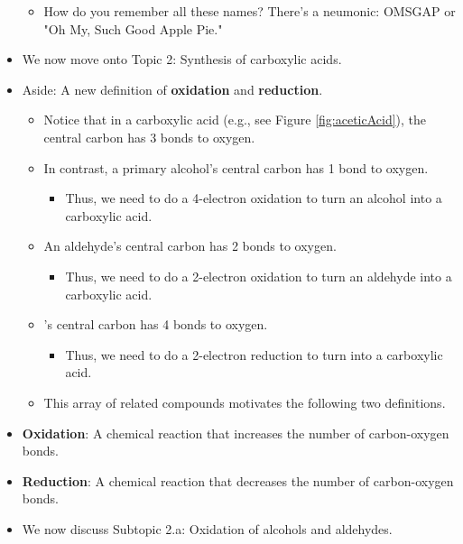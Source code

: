 \documentclass[../notes.tex]{subfiles}
\begin{document}
\begin{itemize}
\begin{itemize}
        \item How do you remember all these names? There's a neumonic: OMSGAP or "Oh My, Such Good Apple Pie."
    \end{itemize}
    \item We now move onto Topic 2: Synthesis of carboxylic acids.
    \item Aside: A new definition of \textbf{oxidation} and \textbf{reduction}.
    \begin{itemize}
        \item Notice that in a carboxylic acid (e.g., see Figure \ref{fig:aceticAcid}), the central carbon has 3 bonds to oxygen.
        \item In contrast, a primary alcohol's central carbon has 1 bond to oxygen.
        \begin{itemize}
            \item Thus, we need to do a 4-electron oxidation to turn an alcohol into a carboxylic acid.
        \end{itemize}
        \item An aldehyde's central carbon has 2 bonds to oxygen.
        \begin{itemize}
            \item Thus, we need to do a 2-electron oxidation to turn an aldehyde into a carboxylic acid.
        \end{itemize}
        \item {}'s central carbon has 4 bonds to oxygen.
        \begin{itemize}
            \item Thus, we need to do a 2-electron reduction to turn  into a carboxylic acid.
        \end{itemize}
        \item This array of related compounds motivates the following two definitions.
    \end{itemize}
    \item \textbf{Oxidation}: A chemical reaction that increases the number of carbon-oxygen bonds.
    \item \textbf{Reduction}: A chemical reaction that decreases the number of carbon-oxygen bonds.
    \item We now discuss Subtopic 2.a{}: Oxidation of alcohols and aldehydes.
    \begin{figure}[h!]
        \centering
        \footnotesize
        \begin{subfigure}[b]{0.57\linewidth}
            \centering

\end{subfigure}
\end{figure}
\end{itemize}
\end{document}
